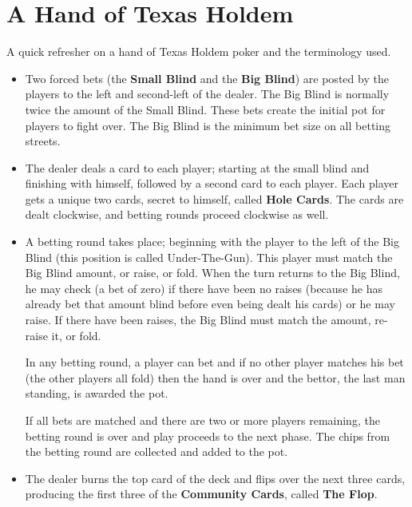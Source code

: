 \chapter{A Hand of Texas Holdem}


A quick refresher on a hand of Texas Holdem poker and the terminology
used.

\begin{itemize}

\item Two forced bets (the \textbf{Small Blind} and the \textbf{Big
  Blind}) are posted by   the players to the left and second-left of
  the dealer. The Big Blind   is normally twice the amount of the
  Small Blind. These bets create the initial pot for players to
  fight over. The Big Blind is the minimum bet size on all betting streets.
  
\item The dealer deals a card to each player; starting at the small
  blind and finishing with himself, followed by a second card to each
  player. Each player gets a unique two cards, secret to himself,
  called \textbf{Hole Cards}. The cards are dealt clockwise, and
  betting rounds proceed clockwise as well.
  
\item A betting round takes place; beginning with the player to the
  left of the Big Blind (this position is called Under-The-Gun). This
  player must match the Big Blind amount, or raise, or fold. When the
  turn returns to the Big Blind, he may check (a bet of zero) if there
  have been no raises (because he has already bet that amount blind
  before even being dealt his cards) or he may raise. If there have
  been raises, the Big Blind must match the amount, re-raise it, or
  fold.

  In any betting round, a player can bet and if no other player
  matches his bet (the other players all fold) then the hand is over
  and the bettor, the last man standing, is awarded the pot.

  If all bets are matched and there are two or more players remaining,
  the betting round is over and play proceeds to the next phase.
  The chips from the betting round are collected and added to the pot.

\item The dealer burns the top card of the deck and flips over the
  next three cards, producing the first three of the \textbf{Community
  Cards}, called \textbf{The Flop}.


\end{itemize}
